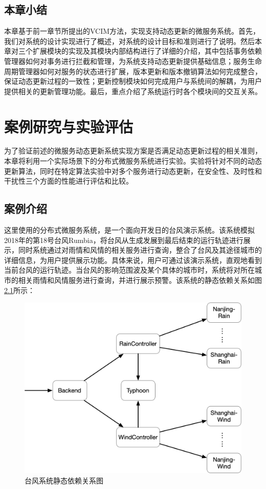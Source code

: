 \documentclass[macfonts,master]{njuthesis}
\begin{document}
\section{本章小结}
本章基于前一章节所提出的VCIM方法，实现支持动态更新的微服务系统。首先，我们对系统的设计实现进行了概述，对系统的设计目标和准则进行了说明。然后本章对三个扩展模块的实现及其模块内部结构进行了详细的介绍，其中包括事务依赖管理器如何对事务进行拦截和管理，为系统支持动态更新提供基础信息；服务生命周期管理器如何对服务的状态进行扩展，版本更新和版本撤销算法如何完成整合，保证动态更新过程的一致性；更新控制模块如何完成用户与系统间的解耦，为用户提供相关的更新管理功能。最后，重点介绍了系统运行时各个模块间的交互关系。

\chapter{案例研究与实验评估}\label{chapter_experiments}
为了验证前述的微服务动态更新系统实现方案是否满足动态更新过程的相关准则，本章将利用一个实际场景下的分布式微服务系统进行实验。实验将针对不同的动态更新算法，同时在特定算法实验中对多个服务进行动态更新，在安全性、及时性和干扰性三个方面的性能进行评估和比较。

\section{案例介绍}
这里使用的分布式微服务系统，是一个面向开发日的台风演示系统。该系统模拟2018年的第18号台风Rumbia，将台风从生成发展到最后结束的运行轨迹进行展示，同时系统通过对雨情和风情的相关服务进行查询，整合了台风及其途径城市的详细信息，为用户提供展示功能。具体来说，用户可通过该演示系统，直观地看到当前台风的运行轨迹。当台风的影响范围波及某个具体的城市时，系统将对所在城市的相关雨情和风情服务进行查询，并进行展示预警。该系统的静态依赖关系如图\ref{fig:typhoon_example}所示：

\begin{figure}[!htbp]
  \centering
  \includegraphics[width= 1.0\textwidth]{image/typhoon_example.png}
  \caption{台风系统静态依赖关系图}
  \label{fig:typhoon_example}
\end{figure}
\end{document}
